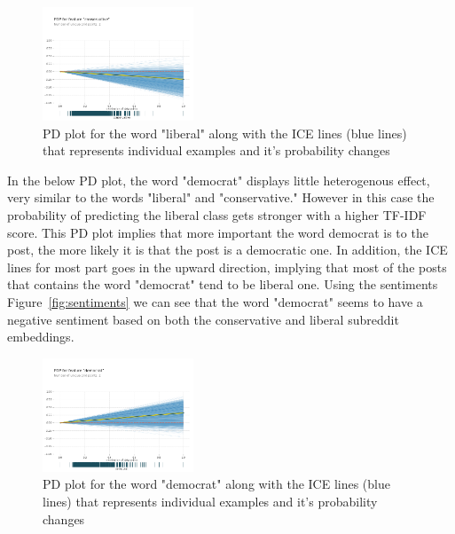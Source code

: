 \documentclass[conference]{IEEEtran}
\begin{document}
\begin{figure}[tb]
    \centering
    \includegraphics[width=0.4\textwidth]{liberal_pdp.pdf}
    \vspace{-2mm}
    \caption{PD plot for the word "liberal" along with the ICE lines (blue lines) that represents individual examples and it's probability changes}
    \label{fig:liberal_pdp}
    \vspace{-5mm}
\end{figure}

In the below PD plot, the word "democrat" displays little heterogenous effect, very similar to the words "liberal" and "conservative." However in this case the probability of predicting the liberal class gets stronger with a higher TF-IDF score. This PD plot implies that more important the word democrat is to the post, the more likely it is that the post is a democratic one. In addition, the ICE lines for most part goes in the upward direction, implying that most of the posts that contains the word "democrat" tend to be liberal one. Using the sentiments Figure~\ref{fig:sentiments} we can see that the word "democrat" seems to have a negative sentiment based on both the conservative and liberal subreddit embeddings.

\begin{figure}[tb]
    \centering
    \includegraphics[width=0.4\textwidth]{democrat_pdp.pdf}
    \vspace{-2mm}
    \caption{PD plot for the word "democrat" along with the ICE lines (blue lines) that represents individual examples and it's probability changes}
    \label{fig:democrat_pdp}
    \vspace{-5mm}
\end{figure}
\end{document}
